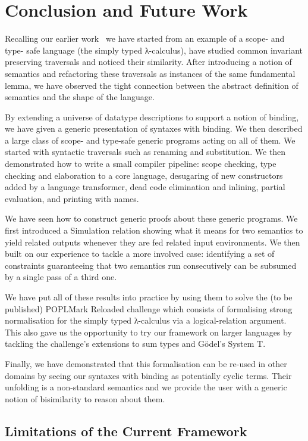 {\section{Conclusion and Future Work}

Recalling our earlier work~\citeyear{allais2017type}
we have started from an example of a scope- and type- safe language (the simply typed
λ-calculus), have studied common invariant preserving traversals and noticed their
similarity. After introducing a notion of semantics and refactoring these traversals as
instances of the same fundamental lemma, we have observed the tight
connection between the abstract definition of semantics and the shape of the
language.

By extending a universe of datatype descriptions to support a notion of binding,
we have given a generic presentation of syntaxes with binding. We then described
a large class of scope- and type-safe generic programs acting on all of them.
We started with syntactic traversals such as renaming and substitution. We then
demonstrated how to write a small compiler pipeline: scope checking, type checking
and elaboration to a core language, desugaring of new constructors added by a language
transformer, dead code elimination and inlining, partial evaluation, and printing
with names.

We have seen how to construct generic proofs about these generic programs. We
first introduced a Simulation relation showing what it means for two semantics
to yield related outputs whenever they are fed related input environments. We
then built on our experience to tackle a more involved case: identifying a set
of constraints guaranteeing that two semantics run consecutively can be subsumed
by a single pass of a third one.

We have put all of these results into practice by using them to solve the (to be
published) POPLMark Reloaded challenge which consists of formalising strong
normalisation for the simply typed λ-calculus via a logical-relation
argument. This also gave us the opportunity to try our framework on larger
languages by tackling the challenge's extensions to sum types and G\"{o}del's
System T.

Finally, we have demonstrated that this formalisation can be re-used
in other domains by seeing our syntaxes with binding as potentially cyclic
terms. Their unfolding is a non-standard semantics and we provide the
user with a generic notion of bisimilarity to reason about them.

\subsection{Limitations of the Current Framework}

}
